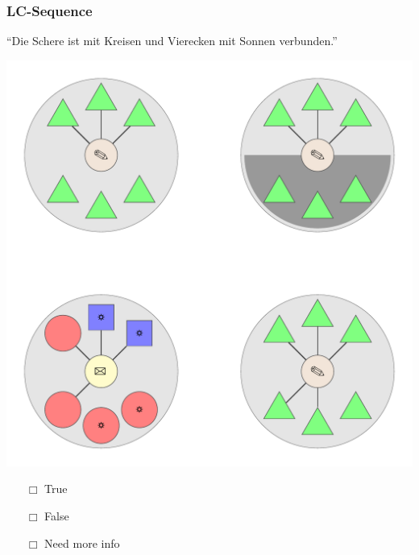 \documentclass[fleqn,10pt,serif,xcolor=dvipsnames]{beamer}
\newcommand{\LC}{LC\xspace}
\newcommand{\mymark}[1]{{\color{blue}{#1}}}
\begin{document}
\begin{frame}
  \frametitle{\LC-Sequence}
  \begin{center}
    ``Die Schere ist mit Kreisen und Vierecken mit Sonnen verbunden.''

    \vspace{0.1cm}

    \includegraphics[width=0.5 \textwidth]{../../pictures/lc_01_6.pdf}

    \vspace{0.1cm}

    \begin{multicols}{3}
      \begin{itemize} 
      \item[$\Box$] True\\
        \onslide<2>{$\leadsto$  \mymark{false}}
      \item[$\Box$] False\\
        \onslide<2>{$\leadsto$ \mymark{EC}}
      \item[$\Box$] Need more info 
      \end{itemize}
    \end{multicols}

  \end{center}
\end{frame}
\end{document}

